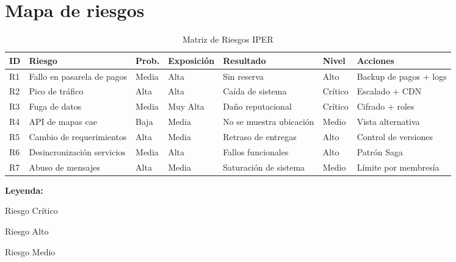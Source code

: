 \section{Mapa de riesgos}
	\begin{table}[H]
		\centering
		\small
		\caption{Matriz de Riesgos IPER}
		\renewcommand{\arraystretch}{2.8}
		\begin{tabularx}{\textwidth}{|
				>{\centering\arraybackslash}m{0.8cm}|
				>{\centering\arraybackslash}m{2.5cm}|
				>{\centering\arraybackslash}m{1.2cm}|
				>{\centering\arraybackslash}m{1.5cm}|
				>{\centering\arraybackslash}m{2.7cm}|
				>{\centering\arraybackslash}m{1.2cm}|
				>{\centering\arraybackslash}m{3.5cm}|}
			\hline
			\rowcolor{headerblue}
			\color{white}\textbf{ID} &
			\color{white}\textbf{Riesgo} &
			\color{white}\textbf{Prob.} &
			\color{white}\textbf{Exposición} &
			\color{white}\textbf{Resultado} &
			\color{white}\textbf{Nivel} &
			\color{white}\textbf{Acciones} \\
			\hline
			R1 & Fallo en pasarela de pagos & Media & Alta & Sin reserva & \cellcolor{mediumrisk}Alto & Backup de pagos + logs \\
			\hline
			R2 & Pico de tráfico & Alta & Alta & Caída de sistema & \cellcolor{highrisk}Crítico & Escalado + CDN \\
			\hline
			R3 & Fuga de datos & Media & Muy Alta & Daño reputacional & \cellcolor{highrisk}Crítico & Cifrado + roles \\
			\hline
			R4 & API de mapas cae & Baja & Media & No se muestra ubicación & \cellcolor{lowrisk}Medio & Vista alternativa \\
			\hline
			R5 & Cambio de requerimientos & Alta & Media & Retraso de entregas & \cellcolor{mediumrisk}Alto & Control de versiones \\
			\hline
			R6 & Desincronización servicios & Media & Alta & Fallos funcionales & \cellcolor{mediumrisk}Alto & Patrón Saga \\
			\hline
			R7 & Abuso de mensajes & Alta & Media & Saturación de sistema & \cellcolor{lowrisk}Medio & Límite por membresía \\
			\hline
		\end{tabularx}
	\end{table}
	
	\vspace{1em}
	\begin{center}
		\textbf{Leyenda:} \\[0.5em]
		\colorbox{highrisk}{\strut \hspace{1em}} Riesgo Crítico \hspace{1em}
		\colorbox{mediumrisk}{\strut \hspace{1em}} Riesgo Alto \hspace{1em}
		\colorbox{lowrisk}{\strut \hspace{1em}} Riesgo Medio
	\end{center}

